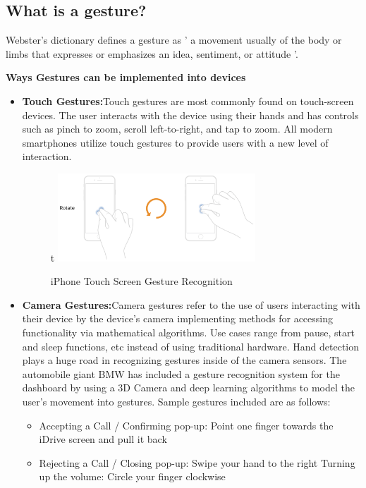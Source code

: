 
\subsection{What is a gesture?}
Webster's dictionary defines a gesture as  ' a movement usually of the body or limbs that expresses or emphasizes an idea, sentiment, or attitude '. 


 \textbf{ Ways Gestures can be implemented into devices }

\begin{itemize}
 \item \textbf{Touch Gestures:}Touch gestures are most commonly found on touch-screen devices. The user interacts with the device using their hands and has controls such as pinch to zoom, scroll left-to-right, and tap to zoom. All modern smartphones utilize touch gestures to provide users with a new level of interaction.
  
  \begin{figure}[h!]
  \centering
t    \includegraphics[width=0.7\textwidth]{Research-Latex/images/touchscreenGestures.png}
     \caption{iPhone Touch Screen Gesture Recognition }
\end{figure}
  
  \item \textbf{Camera Gestures:}Camera gestures refer to the use of users interacting with their device by the device's camera implementing methods for accessing functionality via mathematical algorithms. Use cases range from pause,  start and sleep functions, etc instead of using traditional hardware. Hand detection plays a huge road in recognizing gestures inside of the camera sensors. The automobile giant BMW has included a gesture recognition system for the dashboard by using a 3D Camera and deep learning algorithms to model the user's movement into gestures. Sample gestures included are as follows:
  
 \begin{flushright}
  \begin{itemize}
	\item Accepting a Call  / Confirming pop-up: Point one finger towards the iDrive screen and pull it back
	\item Rejecting a Call / Closing pop-up: Swipe your hand to the right 
Turning up the volume: Circle your finger clockwise
\end{itemize}
   \end{flushright}


\end{itemize}
